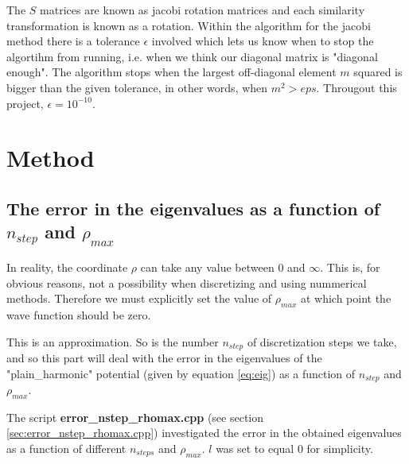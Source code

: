 \documentclass[a4paper,10pt,english]{article}
\numberwithin{figure}{subsection}
\numberwithin{table}{subsection}
\numberwithin{equation}{subsection}
\begin{document}
The $S$ matrices are known as jacobi rotation matrices and each similarity transformation is known 
as a rotation. 
Within the algorithm for the jacobi method there is a tolerance $\epsilon$ involved 
which lets us know when to stop the algortihm from running, i.e.
when we think our diagonal matrix is "diagonal enough". 
The algorithm stops when the largest off-diagonal element $m$ squared is bigger than 
the given tolerance, in other words, when $m^2 > eps$. 
Througout this project, $\epsilon = 10^{-10}$. 

































\section{Method}

\subsection{The error in the eigenvalues as a function of $n_{step}$ and $\rho_{max}$}
\label{sec:error_nstep_rhomax}
In reality, the coordinate $\rho$ can take any value between $0$ and $\infty$. 
This is, for obvious reasons, not a possibility when discretizing and 
using nummerical methods. 
Therefore we must explicitly set the value of $\rho_{max}$ at which point the 
wave function should be zero.

This is an approximation. 
So is the number $n_{step}$ of discretization steps we take, and so 
this part will deal with the error in the eigenvalues of the "plain\_harmonic" potential
(given by equation \ref{eq:eig}) 
as a function of $n_{step}$ and $\rho_{max}$. 

The script \textbf{error\_nstep\_rhomax.cpp} 
(see section \ref{sec:error_nstep_rhomax.cpp})
investigated the error in the obtained eigenvalues as a function of different 
$n_{steps}$ and $\rho_{max}$. 
$l$ was set to equal $0$ for simplicity. 
\end{document}

